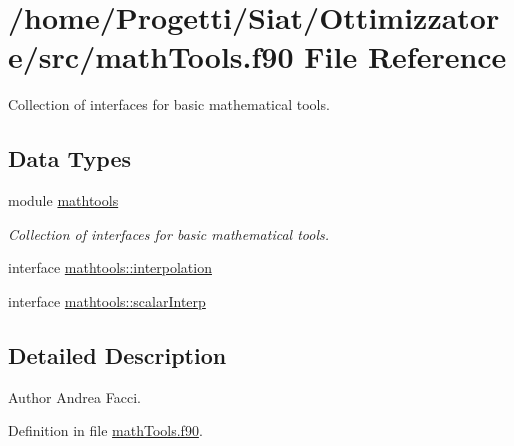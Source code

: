 \hypertarget{math_tools_8f90}{\section{/home/\-Progetti/\-Siat/\-Ottimizzatore/src/math\-Tools.f90 File Reference}
\label{math_tools_8f90}
}


Collection of interfaces for basic mathematical tools.  


\subsection*{Data Types}
\begin{DoxyCompactItemize}
\item 
module \hyperlink{classmathtools}{mathtools}
\begin{DoxyCompactList}\small\item\em Collection of interfaces for basic mathematical tools. \end{DoxyCompactList}\item 
interface \hyperlink{interfacemathtools_1_1interpolation}{mathtools\-::interpolation}
\item 
interface \hyperlink{interfacemathtools_1_1scalar_interp}{mathtools\-::scalar\-Interp}
\end{DoxyCompactItemize}


\subsection{Detailed Description}
\begin{DoxyAuthor}{Author}
Andrea Facci. 
\end{DoxyAuthor}


Definition in file \hyperlink{math_tools_8f90_source}{math\-Tools.\-f90}.

